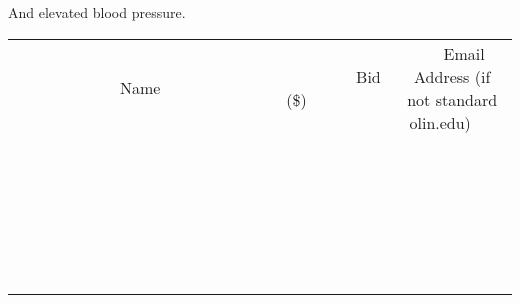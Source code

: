 \documentclass[11pt]{article}
\begin{document}
And elevated blood pressure.
\\[6ex]
\begin{tabular}{c c c}
~~~~~~~~~~~~~Name~~~~~~~~~~~~~ & ~~~~~~~~~Bid (\$)~~~~~~~~~  & ~~~Email Address (if not standard olin.edu)~~~\\
 & & \\
\hline
 & & \\
\hline
 & & \\
\hline
 & & \\
\hline
 & & \\
\hline
 & & \\
\hline
 & & \\
\hline
 & & \\
\hline
 & & \\
\hline
 & & \\
\hline
 & & \\
\hline
 & & \\
\hline
 & & \\
\hline
 & & \\
\hline
 & & \\
\hline
 & & \\
\hline
 & & \\
\hline
 & & \\
\hline
 & & \\
\hline
 & & \\
\hline
 & & \\
\hline
 & & \\
\hline
 & & \\
\hline
 & & \\
\hline
 & & \\
\hline
 & & \\
\hline
\end{tabular}
\newpage
\end{document}
